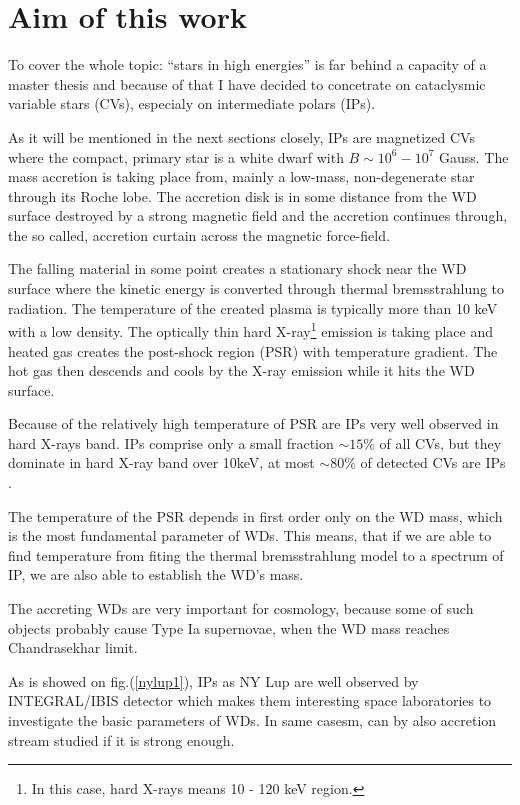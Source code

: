 \documentclass[oneside,a4paper,11pt]{report}
\begin{document}
\section{Aim of this work}
To cover the whole topic: ``stars in high energies'' is far behind a capacity of a master thesis and because of that I have decided 
to concetrate on cataclysmic variable stars (CVs), especialy on intermediate polars (IPs). 

As it will be mentioned in the next sections closely, IPs are magnetized CVs where the compact, primary star 
is a white dwarf with $B\sim 10^6 -10^7$ Gauss. The mass accretion is taking place from, mainly a low-mass, non-degenerate star through its Roche lobe.  
The accretion disk is in some distance from the WD surface destroyed by a strong magnetic field and 
the accretion continues through, the so called, accretion curtain across the magnetic force-field.

The falling material in some point creates a stationary shock near the WD surface where the kinetic energy is converted 
through thermal bremsstrahlung to radiation. The temperature of the created plasma is typically more than 
10 keV with a low density. The optically thin hard X-ray\footnote{In this case, hard X-rays means 10 - 120 keV region.} emission is taking place and heated gas creates the 
post-shock region (PSR) with temperature gradient. The hot gas then descends and cools by the X-ray 
emission while it hits the WD surface.      

Because of the relatively high temperature of PSR are IPs very well observed in hard X-rays band. 
IPs comprise only a small fraction $\sim 15\%$ of all CVs, but they dominate in hard X-ray band over 10keV, at most 
$\sim 80\%$ of detected CVs are IPs \citet{2009MNRAS.392..630L}. 

The temperature of the PSR depends in first order only on the WD mass, which is the most fundamental parameter of WDs.
This means, that if we are able to find temperature from fiting the thermal bremsstrahlung model to a spectrum of IP, 
we are also able to establish the WD's mass. 

The accreting WDs are very important for cosmology, because some of such objects probably cause Type Ia supernovae, 
when the WD mass reaches Chandrasekhar limit. 

As is showed on fig.(\ref{nylup1}), IPs as NY Lup are well observed by INTEGRAL/IBIS detector which makes them 
interesting space laboratories to investigate the basic parameters of WDs. In same casesm, can by also accretion stream studied
if it is strong enough. 
    
\end{document}
